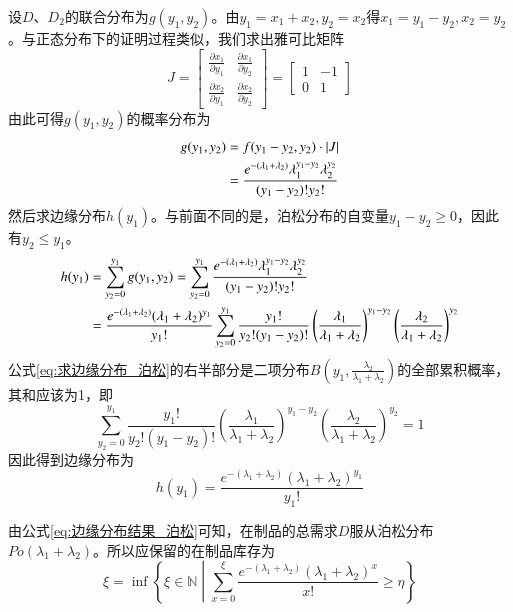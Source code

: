 设$D$、$D_2$的联合分布为$g(y_1,y_2)$。由$y_1=x_1+x_2,y_2=x_2$得$x_1=y_1-y_2,x_2=y_2$。与正态分布下的证明过程类似，我们求出雅可比矩阵
\[
J = \begin{bmatrix}
\frac{\partial x_1}{\partial y_1} & \frac{\partial x_1}{\partial y_2} \\
\frac{\partial x_2}{\partial y_1} & \frac{\partial x_2}{\partial y_2}
\end{bmatrix} = \begin{bmatrix}
1 & -1 \\
0 & 1
\end{bmatrix}
\]
由此可得$g(y_1,y_2)$的概率分布为
\begin{align}
g(y_1,y_2) &= f(y_1-y_2,y_2)\cdot\left|J\right| \notag\\
&= \frac{e^{-(\lambda_1+\lambda_2)}\lambda_1^{y_1-y_2}\lambda_2^{y_2}}{(y_1-y_2)!y_2!}
\label{eq:新联合分布_泊松}
\end{align}
然后求边缘分布$h(y_1)$。与前面不同的是，泊松分布的自变量$y_1-y_2\geq 0$，因此有$y_2\leq y_1$。
\begin{align}
h(y_1) &= \sum_{y_2=0}^{y_1}g(y_1,y_2) = \sum_{y_2=0}^{y_1}\frac{e^{-(\lambda_1+\lambda_2)}\lambda_1^{y_1-y_2}\lambda_2^{y_2}}{(y_1-y_2)!y_2!} \notag\\
&= \frac{e^{-(\lambda_1+\lambda_2)}(\lambda_1+\lambda_2)^{y_1}}{y_1!}\sum_{y_2=0}^{y_1}\frac{y_1!}{y_2!(y_1-y_2)!}\left(\frac{\lambda_1}{\lambda_1+\lambda_2}\right)^{y_1-y_2}\left(\frac{\lambda_2}{\lambda_1+\lambda_2}\right)^{y_2}
\label{eq:求边缘分布_泊松}
\end{align}
公式\ref{eq:求边缘分布_泊松}的右半部分是二项分布$B(y_1,\frac{\lambda_2}{\lambda_1+\lambda_2})$的全部累积概率，其和应该为1，即
\[
\sum_{y_2=0}^{y_1}\frac{y_1!}{y_2!(y_1-y_2)!}\left(\frac{\lambda_1}{\lambda_1+\lambda_2}\right)^{y_1-y_2}\left(\frac{\lambda_2}{\lambda_1+\lambda_2}\right)^{y_2} = 1
\]
因此得到边缘分布为
\begin{equation}
h(y_1) = \frac{e^{-(\lambda_1+\lambda_2)}(\lambda_1+\lambda_2)^{y_1}}{y_1!}
\label{eq:边缘分布结果_泊松}
\end{equation}

由公式\ref{eq:边缘分布结果_泊松}可知，在制品的总需求$D$服从泊松分布$Po(\lambda_1+\lambda_2)$。所以应保留的在制品库存为
\begin{equation}
\xi = \inf\left\{\xi\in\mathbb{N}\middle|\sum_{x=0}^{\xi}\frac{e^{-(\lambda_1+\lambda_2)}(\lambda_1+\lambda_2)^x}{x!}\geq \eta\right\}
\label{eq:在制品库存_泊松}
\end{equation}

